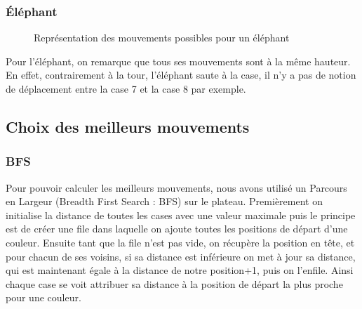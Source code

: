 \subsubsection{Éléphant}
\begin{figure}[H]
    \centering
    \hspace{1.5em}
    \caption{Représentation des mouvements possibles pour un éléphant}
\end{figure}
Pour l'éléphant, on remarque que tous ses mouvements sont à la même hauteur.
En effet, contrairement à la tour, l'éléphant saute à la case, il n'y a pas
de notion de déplacement entre la case 7 et la case 8 par exemple.
\subsection{Choix des meilleurs mouvements}
\label{distance}
\subsubsection{BFS}
Pour pouvoir calculer les meilleurs mouvements, nous avons utilisé un Parcours en Largeur (Breadth First Search : BFS) sur le plateau.
Premièrement on initialise la distance de toutes les cases avec une valeur maximale puis
le principe est de créer une file dans laquelle on ajoute toutes les positions de départ d'une couleur.
Ensuite tant que la file n'est pas vide, on récupère la position en tête, et pour chacun de ses voisins,
si sa distance est inférieure on met à jour sa distance, qui est maintenant égale à la distance de notre position+1,
puis on l'enfile.
Ainsi chaque case se voit attribuer sa distance à la position de départ la plus proche pour une couleur.

